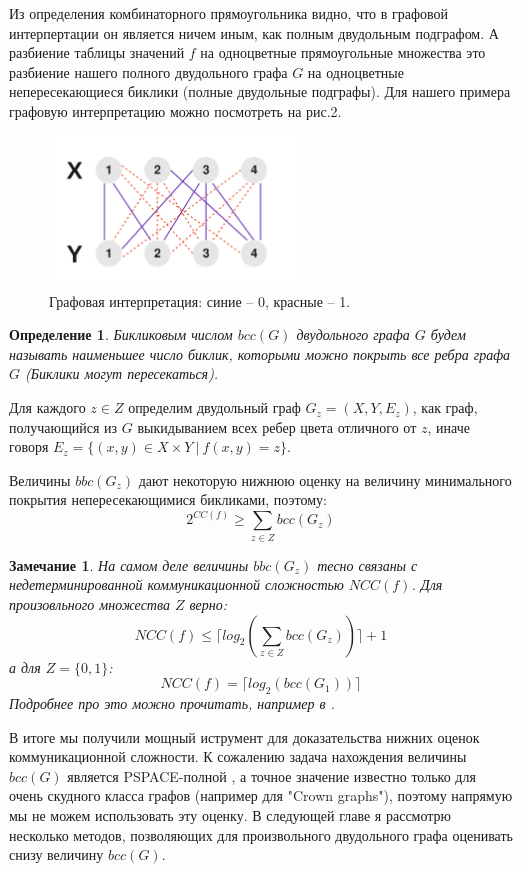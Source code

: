 \documentclass[a4paper]{article}
\newtheorem*{mremark}{Замечание}
\newtheorem*{mdefinition}{Определение}
\begin{document}
Из определения комбинаторного прямоугольника видно, что в графовой интерпертации он является ничем
иным, как полным двудольным подграфом. А разбиение таблицы значений $f$ на одноцветные прямоугольные
множества это разбиение нашего  полного двудольного графа $G$ на одноцветные непересекающиеся биклики 
(полные двудольные подграфы). Для нашего примера графовую интерпретацию можно посмотреть на рис.2.

\begin{figure}
	\centering
	\includegraphics[width=0.6\textwidth]{images/biclique.png}
	\caption{Графовая интерпретация: синие -- 0, красные -- 1.}
\end{figure}

\begin{mdefinition}
	Бикликовым числом $bcc(G)$ двудольного графа $G$ будем называть наименьшее число биклик, которыми 
	можно покрыть все ребра графа $G$ (Биклики могут пересекаться).
\end{mdefinition}

Для каждого $z \in Z$ определим двудольный граф $G_z = (X, Y, E_z)$, как граф, получающийся из $G$ 
выкидыванием всех ребер цвета отличного от $z$, иначе говоря $E_z = \{(x,y)\in X\times Y\ |\ f(x, y) = z \}$.

Величины $bbc(G_z)$ дают некоторую нижнюю оценку на величину минимального покрытия непересекающимися 
бикликами, поэтому: $$2^{CC(f)}\geq \sum\limits_{z\in Z}bcc(G_z)$$

\begin{mremark}
    На самом деле величины $bbc(G_z)$ тесно связаны с недетерминированной коммуникационной сложностью 
    $NCC(f)$. Для произовльного множества $Z$ верно: 
    $$NCC(f) \leq \lceil log_2(\sum\limits_{z\in Z}bcc(G_z))\rceil + 1$$ а для 
    $Z = \{0, 1\}$: $$NCC(f) = \lceil log_2(bcc(G_1))\rceil$$ 
    Подробнее про это можно прочитать, например в \cite{Razborov}.
\end{mremark}

В итоге мы получили мощный иструмент для доказательства нижних оценок коммуникационной сложности. 
К сожалению задача нахождения величины $bcc(G)$ является PSPACE-полной \cite{HermannMarkus}, а точное 
значение известно только для очень скудного класса графов (например для "Crown graphs"), поэтому 
напрямую мы не можем использовать эту оценку. В следующей главе я рассмотрю несколько методов, 
позволяющих для произвольного двудольного графа оценивать снизу величину $bcc(G)$.
\end{document}
